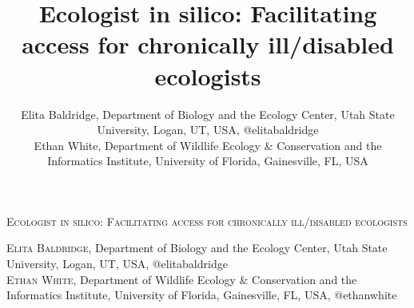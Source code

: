 \documentclass{beamer}
\author{Elita Baldridge, Department of Biology and the Ecology Center, Utah State University, Logan, UT, USA, @elitabaldridge  \\Ethan White, Department of Wildlife Ecology \& Conservation and the Informatics Institute, University of Florida, Gainesville, FL, USA}
\title[17pt]{Ecologist in silico: Facilitating access for chronically ill/disabled ecologists}
\date{}
\begin{document}
\begin{center} 
\begin{huge}
\textsc{%
Ecologist in silico: Facilitating access for chronically ill/disabled ecologists\\
 }
\end{huge}  
\begin{large}
\textsc{Elita Baldridge}, Department of Biology and the Ecology Center, Utah State University, Logan, UT, USA, @elitabaldridge\\  
\textsc{Ethan White}, Department of Wildlife Ecology \& Conservation and the Informatics Institute, University of Florida, Gainesville, FL, USA, @ethanwhite
\end{large}
\end{center}
\end{document}
